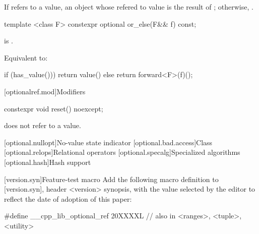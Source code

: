 \begin{addedblock}
\begin{itemdescr}
  \pnum
  \returns
  If  refers to a value, an  object
  whose refered to value is the result of
  ;
  otherwise, .
\end{itemdescr}

\begin{itemdecl}
template <class F>
constexpr optional or_else(F&& f) const;
\end{itemdecl}

\begin{itemdescr}
  \pnum
  \mandates
   is .

  \pnum
  \effects
  Equivalent to:
  \begin{codeblock}
    if (has_value()))
        return value()
    else
        return forward<F>(f)();
  \end{codeblock}
\end{itemdescr}


[optionalref.mod]{Modifiers}

\begin{itemdecl}
constexpr void reset() noexcept;
\end{itemdecl}

\begin{itemdescr}
  \pnum
  \ensures
   does not refer to a value.
\end{itemdescr}

\end{addedblock}

[optional.nullopt]{No-value state indicator}
[optional.bad.access]{Class }
[optional.relops]{Relational operators}
[optional.specalg]{Specialized algorithms}
[optional.hash]{Hash support}

\begin{addedblock}
[version.syn]{Feature-test macro}
Add the following macro definition to [version.syn], header <version> synopsis, with the value selected by the editor to reflect the date of adoption of this paper:

\begin{codeblock}
  #define __cpp_lib_optional_ref 20XXXXL // also in <ranges>, <tuple>, <utility>
\end{codeblock}
\end{addedblock}
